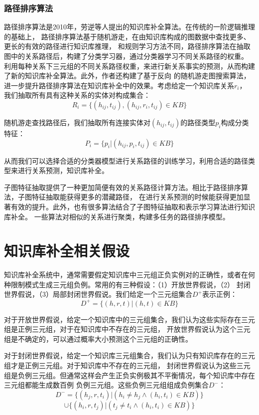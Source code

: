 \subsubsection{路径排序算法}
路径排序算法\cite{Lao2010}是2010年，劳逆等人提出的知识库补全算法。在传统的一阶逻辑推理的基础上，
路径排序算法基于随机游走，在由知识库构成的图数据中查找更多、更长的有效的路径进行知识库推理，
和规则学习方法不同，路径排序算法在抽取图中的关系路径后，构建了分类学习器，通过分类器学习不同关系路径的权重。
利用每种关系下三元组的不同关系路径权重，来进行新关系事实的预测，从而构建了新的知识库补全算法。此外，作者还构建了基于反向
的随机游走图搜索算法\cite{Lao2015LearningRF}，进一步提升路径排序算法在知识库补全中的效果。考虑给定一个知识库关系$r_i$，
我们抽取所有具有这种关系的实体对构成集合：
$$R_i=\{{(h_{ij},t_{ij}),(h_{ij},r_i,t_{ij})\in KB}\}$$

随机游走查找路径后，我们抽取所有连接实体对$(h_{ij},t_{ij})$的路径类型$p_i$构成分类特征：
$$P_i=\{{p_i|(h_{ij},p_i,t_{ij})\in KB}\}$$

从而我们可以选择合适的分类器模型进行关系路径的训练学习，利用合适的路径类型来进行关系预测，知识库补全。

子图特征抽取\cite{Gardner2015}提供了一种更加简便有效的关系路径计算方法。相比于路径排序算法，子图特征抽取能获得更多的潜藏路径，
在进行关系预测的时候能获得更加显著有效的提升。此外，也有很多算法结合了子图特征抽取和表示学习算法\cite{Gardner2014}进行知识库补全。
一些算法对相似的关系进行聚类，构建多任务的路径排序模型\cite{Wang2016}。


\section{知识库补全相关假设}
知识库补全系统中，通常需要假定知识库中三元组正负实例对的正确性，或者在何种限制模式生成三元组负例。常用的有三种假设：（1）开放世界假说，（2）
封闭世界假说，（3）局部封闭世界假说。我们给定一个三元组集合$D^+$表示正例：
$$D^+=\{(h,r,t)|(h,t) \in KB\}$$

对于开放世界假说，给定一个知识库中的三元组集合，我们认为这些实际存在三元组是正例三元组，对于在知识库中不存在的三元组，
开放世界假说认为这个三元组是不确定的，可以通过概率大小预测这个三元组的正确性。

对于封闭世界假说，给定一个知识库三元组集合，我们认为只有知识库存在的三元组才是正例三元组。对于知识库中不存在的三元组，
封闭世界假说认为这些三元组是负例三元组。但通常这样会产生正负实例极其不平衡情况，每个知识库中存在三元组都能生成数百例
负例三元组。这些负例三元组组成负例集合$D^-$：
$$D^-=\{(h_j,r,t_i)|(h_i \ne h_j \wedge (h_i,t_i) \in KB)\}$$
$$ \cup \{(h_i,r,t_j)|(t_j \ne t_i \wedge(h_i,t_i) \in KB)\}$$

